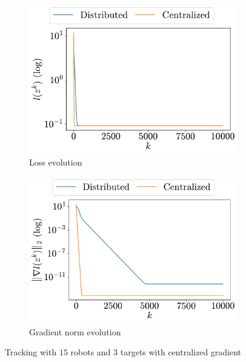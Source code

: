 \documentclass[a4paper,11pt,oneside]{book}
\begin{document}
\begin{figure}[H]
      \centering
      \begin{subfigure}[t]{0.46\linewidth}
            \centering
            \includegraphics[width=\linewidth]{./figs/tracking/centralized/loss.pdf} 
            \caption{Loss evolution}
      \end{subfigure}
      \hfill
      \begin{subfigure}[t]{0.46\linewidth}
            \centering
            \includegraphics[width=\linewidth]{./figs/tracking/centralized/gradient.pdf} 
            \caption{Gradient norm evolution}
      \end{subfigure}
      \caption{Tracking with $15$ robots and $3$ targets with centralized gradient}
      \label{fig:tracking_centralized_5_3}
\end{figure}
\end{document}
